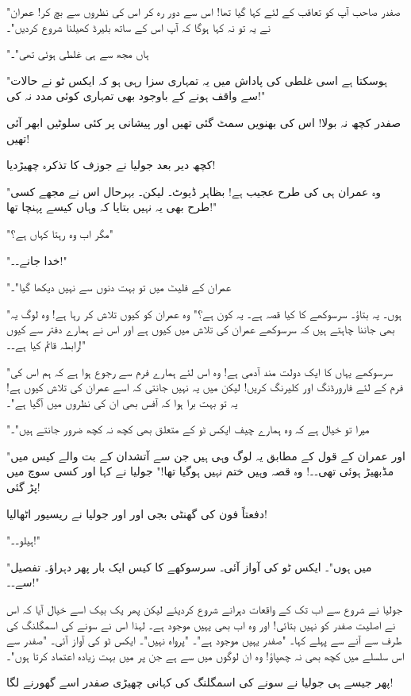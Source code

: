 "صفدر صاحب آپ کو تعاقب کے لئے کہا گیا تھا! اس سے دور رہ کر اس کی نظروں سے بچ کر! عمران نے یہ تو نہ کہا ہوگا کہ آپ اس کے ساتھ بلیرڈ کھیلنا شروع کردیں"۔

"ہاں مجھ سے ہی غلطی ہوئی تھی"۔

"ہوسکتا ہے اسی غلطی کی پاداش میں یہ تمہاری سزا رہی ہو کہ ایکس ٹو نے حالات سے واقف ہونے کے باوجود بھی تمہاری کوئی مدد نہ کی!"

صفدر کچھ نہ بولا! اس کی بھنویں سمٹ گئی تھیں اور پیشانی پر کئی سلوٹیں ابھر آئی تھیں!

کچھ دیر بعد جولیا نے جوزف کا تذکرہ چھیڑدیا!

"وہ عمران ہی کی طرح عجیب ہے! بظاہر ڈیوٹ۔ لیکن۔ بہرحال اس نے مجھے کسی طرح بھی یہ نہیں بتایا کہ وہاں کیسے پہنچا تھا!"

"مگر اب وہ رہتا کہاں ہے؟"

"خدا جانے۔۔!"

"عمران کے فلیٹ میں تو بہت دنوں سے نہیں دیکھا گیا"۔

"ہوں۔ یہ بتاؤ۔ سرسوکھے کا کیا قصہ ہے۔ یہ کون ہے؟" وہ عمران کو کیوں تلاش کر رہا ہے! وہ لوگ یہ بھی جاننا چاہتے ہیں کہ سرسوکھے عمران کی تلاش میں کیوں ہے اور اس نے ہمارے دفتر سے کیوں رابطہ قائم کیا ہے۔۔!"

"سرسوکھے یہاں کا ایک دولت مند آدمی ہے! وہ اس لئے ہمارے فرم سے رجوع ہوا ہے کہ ہم اس کی فرم کے لئے فارورڈنگ اور کلیرنگ کریں! لیکن میں یہ نہیں جانتی کہ اسے عمران کی تلاش کیوں ہے! یہ تو بہت برا ہوا کہ آفس بھی ان کی نظروں میں آگیا ہے"۔

"میرا تو خیال ہے کہ وہ ہمارے چیف ایکس ٹو کے متعلق بھی کچھ نہ کچھ ضرور جانتے ہیں"۔

"اور عمران کے قول کے مطابق یہ لوگ وہی ہیں جن سے آتشدان کے بت والے کیس میں مڈبھیڑ ہوئی تھی۔۔! وہ قصہ وہیں ختم نہیں ہوگیا تھا!" جولیا نے کہا اور کسی سوچ میں پڑ گئی!

دفعتاً فون کی گھنٹی بجی اور اور جولیا نے ریسیور اٹھالیا!

"ہیلو۔۔!"

"میں ہوں"۔ ایکس ٹو کی آواز آئی۔ سرسوکھے کا کیس ایک بار پھر دہراؤ۔ تفصیل سے۔۔!"

جولیا نے شروع سے اب تک کے واقعات دہرانے شروع کردیئے لیکن پھر یک بیک اسے خیال آیا کہ اس نے اصلیت صفدر کو نہیں بتائی! اور وہ اب بھی یہیں موجود ہے۔ لہذا اس نے سونے کی اسمگلنگ کی طرف سے آنے سے پہلے کہا۔ "صفدر یہیں موجود ہے"۔
"پرواہ نہیں"۔ ایکس ٹو کی آواز آئی۔ "صفدر سے اس سلسلے میں کچھ بھی نہ چھپاؤ! وہ ان لوگوں میں سے ہے جن پر میں بہت زیادہ اعتماد کرتا ہوں"۔

پھر جیسے ہی جولیا نے سونے کی اسمگلنگ کی کہانی چھیڑی صفدر اسے گھورنے لگا!

